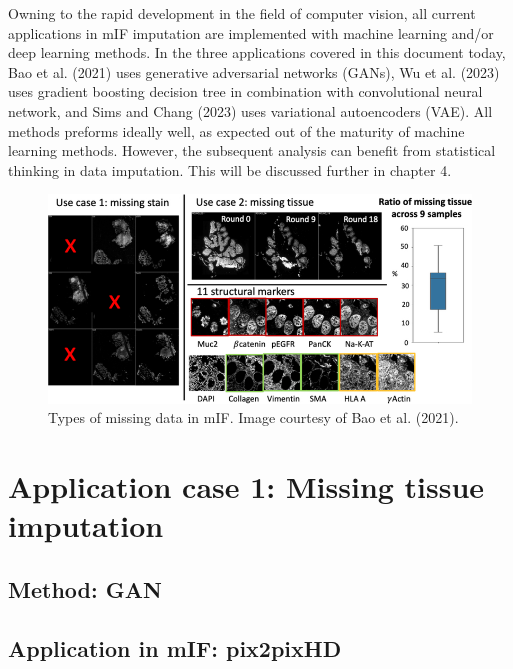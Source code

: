 \documentclass[
  letterpaper,
  DIV=11,
  numbers=noendperiod,
  oneside]{scrreprt}
\begin{document}
Owning to the rapid development in the field of computer vision, all
current applications in mIF imputation are implemented with machine
learning and/or deep learning methods. In the three applications covered
in this document today, Bao et al. (2021) uses generative adversarial
networks (GANs), Wu et al. (2023) uses gradient boosting decision tree
in combination with convolutional neural network, and Sims and Chang
(2023) uses variational autoencoders (VAE). All methods preforms ideally
well, as expected out of the maturity of machine learning methods.
However, the subsequent analysis can benefit from statistical thinking
in data imputation. This will be discussed further in chapter 4.

\begin{figure}

{\centering \includegraphics{missingmIF.jpeg}

}

\caption{\label{fig-31}Types of missing data in mIF. Image courtesy of
Bao et al. (2021).}

\end{figure}

\hypertarget{application-case-1-missing-tissue-imputation}{%
\section{Application case 1: Missing tissue
imputation}\label{application-case-1-missing-tissue-imputation}}

\hypertarget{method-gan}{%
\subsection{Method: GAN}\label{method-gan}}

\hypertarget{sec-imputation1}{%
\subsection{Application in mIF: pix2pixHD}\label{sec-imputation1}}
\end{document}
